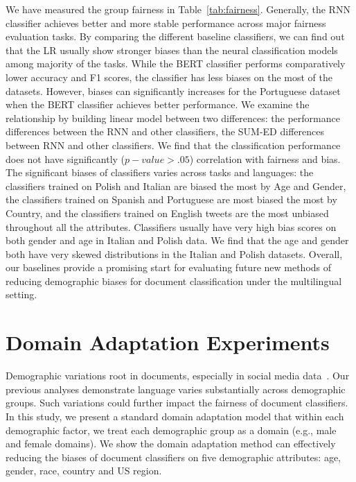 We have measured the group fairness in Table~\ref{tab:fairness}. 
Generally, the RNN classifier achieves better and more stable performance across major fairness evaluation tasks.
By comparing the different baseline classifiers, we can find out that the LR usually show stronger biases than the neural classification models among majority of the tasks.
While the BERT classifier performs comparatively lower accuracy and F1 scores, the classifier has less biases on the most of the datasets.
However, biases can significantly increases for the Portuguese dataset when the BERT classifier achieves better performance.
We examine the relationship by building linear model between two differences: the performance differences between the RNN and other classifiers, the SUM-ED differences between RNN and other classifiers.
We find that the classification performance does not have significantly ($p-value > .05$) correlation with fairness and bias.
The significant biases of classifiers varies across tasks and languages: the classifiers trained on Polish and Italian are biased the most by Age and Gender, the classifiers trained on Spanish and Portuguese are most biased the most by Country, and the classifiers trained on English tweets are the most unbiased throughout all the attributes.
Classifiers usually have very high bias scores on both gender and age in Italian and Polish data.
We find that the age and gender both have very skewed distributions in the Italian and Polish datasets. 
Overall, our baselines provide a promising start for evaluating future new methods of reducing demographic biases for document classification under the multilingual setting.


\section{Domain Adaptation Experiments}
Demographic variations root in documents, especially in social media data~\cite{volkova2013exploring,hovy2015demographic}.
Our previous analyses demonstrate language varies substantially across demographic groups.
Such variations could further impact the fairness of document classifiers.
In this study, we present a standard domain adaptation model that within each demographic factor, we treat each demographic group as a domain (e.g., male and female domains).
We show the domain adaptation method can effectively reducing the biases of document classifiers on five demographic attributes: age, gender, race, country and US region.

